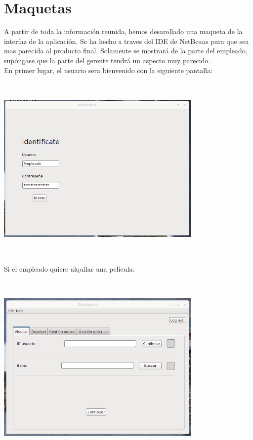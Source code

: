 \section{Maquetas}
A partir de toda la información reunida, hemos desarollado una maqueta de la interfaz de la aplicación. Se ha hecho a traves del IDE de NetBeans para que sea mas parecida al producto final. Solamente se mostrará de la parte del empleado, supóngase que la parte del gerente tendrá un aspecto muy parecido.\\

En primer lugar, el usuario sera bienvenido con la siguiente pantalla:\\
\includegraphics[width=10cm, height=10cm, keepaspectratio]{img/inicio.jpg}\\

Si el empleado quiere alquilar una película:\\
\includegraphics[width=10cm, height=10cm, keepaspectratio]{img/empleado-alquilar.jpg}\\
\clearpage

